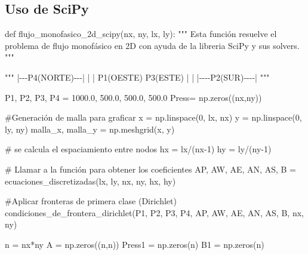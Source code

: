 \documentclass[
  letterpaper,
  DIV=11,
  numbers=noendperiod]{scrreprt}
\newenvironment{Shaded}{\begin{snugshade}}{\end{snugshade}}
\newcommand{\CommentTok}[1]{\textcolor[rgb]{0.37,0.37,0.37}{#1}}
\newcommand{\DecValTok}[1]{\textcolor[rgb]{0.68,0.00,0.00}{#1}}
\newcommand{\FloatTok}[1]{\textcolor[rgb]{0.68,0.00,0.00}{#1}}
\newcommand{\KeywordTok}[1]{\textcolor[rgb]{0.00,0.23,0.31}{#1}}
\newcommand{\NormalTok}[1]{\textcolor[rgb]{0.00,0.23,0.31}{#1}}
\newcommand{\OperatorTok}[1]{\textcolor[rgb]{0.37,0.37,0.37}{#1}}
\begin{document}
\subsection{Uso de SciPy}\label{uso-de-scipy}

\begin{Shaded}
\begin{Highlighting}[]
\KeywordTok{def}\NormalTok{ flujo\_monofasico\_2d\_scipy(nx, ny, lx, ly):}
    \CommentTok{"""}
\CommentTok{    Esta función resuelve el problema de flujo monofásico en 2D con ayuda de la libreria SciPy y sus solvers.  }
\CommentTok{    """}
    
    \CommentTok{"""}
\CommentTok{        |{-}{-}{-}P4(NORTE){-}{-}{-}|}
\CommentTok{        |               |}
\CommentTok{    P1(OESTE)        P3(ESTE)}
\CommentTok{        |               |}
\CommentTok{        |{-}{-}{-}{-}P2(SUR){-}{-}{-}{-}|}
\CommentTok{    """}

\NormalTok{    P1, P2, P3, P4  }\OperatorTok{=} \FloatTok{1000.0}\NormalTok{, }\FloatTok{500.0}\NormalTok{, }\FloatTok{500.0}\NormalTok{, }\FloatTok{500.0}
\NormalTok{    Press}\OperatorTok{=}\NormalTok{ np.zeros((nx,ny))}

    \CommentTok{\#Generación de malla para graficar}
\NormalTok{    x }\OperatorTok{=}\NormalTok{ np.linspace(}\DecValTok{0}\NormalTok{, lx, nx)}
\NormalTok{    y }\OperatorTok{=}\NormalTok{ np.linspace(}\DecValTok{0}\NormalTok{, ly, ny)}
\NormalTok{    malla\_x, malla\_y }\OperatorTok{=}\NormalTok{ np.meshgrid(x, y)}
    
    \CommentTok{\# se calcula el espaciamiento entre nodos}
\NormalTok{    hx }\OperatorTok{=}\NormalTok{ lx}\OperatorTok{/}\NormalTok{(nx}\OperatorTok{{-}}\DecValTok{1}\NormalTok{)}
\NormalTok{    hy }\OperatorTok{=}\NormalTok{ ly}\OperatorTok{/}\NormalTok{(ny}\OperatorTok{{-}}\DecValTok{1}\NormalTok{)}
    
    \CommentTok{\# Llamar a la función para obtener los coeficientes}
\NormalTok{    AP, AW, AE, AN, AS, B }\OperatorTok{=}\NormalTok{ ecuaciones\_discretizadas(lx, ly, nx, ny, hx, hy)}

    
    \CommentTok{\#Aplicar fronteras de primera clase (Dirichlet)}
\NormalTok{    condiciones\_de\_frontera\_dirichlet(P1, P2, P3, P4, AP, AW, AE, AN, AS, B, nx, ny)}
    
    
\NormalTok{    n }\OperatorTok{=}\NormalTok{ nx}\OperatorTok{*}\NormalTok{ny}
\NormalTok{    A }\OperatorTok{=}\NormalTok{ np.zeros((n,n))}
\NormalTok{    Press1 }\OperatorTok{=}\NormalTok{ np.zeros(n)}
\NormalTok{    B1 }\OperatorTok{=}\NormalTok{ np.zeros(n)}


\end{Highlighting}
\end{Shaded}
\end{document}
